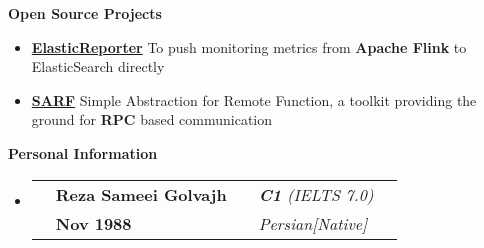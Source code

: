 \documentclass[letterpaper,12pt]{article}[leftmargin=*]
\makeatletter
\def \entryspacing {-0pt}
\renewcommand{\section}[2]{\vspace{5pt}
  \colorbox{secondary}{\color{white}\raggedbottom\normalsize\textbf{{#1}{\hspace{7pt}#2}}}
}
\newcommand{\resumeEntryStart}{\begin{itemize}[leftmargin=2.5mm]}
\newcommand{\resumeEntryEnd}{\end{itemize}\vspace{\entryspacing}}
\newcommand{\aboutMeEntryTSDL}[4]{
  \vspace{-1pt}\item[]
    \begin{tabular*}{0.97\textwidth}{l@{\extracolsep{\fill}}lrlr}
	  \color{primary}{Full name} & \textbf{\color{accent}#1} &
	  \color{primary}{English Fluency} & \textit{\color{accent}#3} \\
	  \color{primary}{Date of Birth} & \textbf{\color{accent}#2} &
	  \color{primary}{Other Languages} & \textit{\color{accent}#4} \\
    \end{tabular*}\vspace{-6pt}
}
\newcommand{\resumeEntryS}[2]{
  \item[]\small{
    \textbf{\color{primary}#1 }{ #2 \vspace{-6pt}}
  }
}
\makeatother
\begin{document}
\section{\faFolderOpen}{Open Source Projects}
	\resumeEntryStart
		\resumeEntryS{\href{https://github.com/sameei/elasticreporter}{ElasticReporter}} {To push monitoring metrics from \textbf{Apache Flink} to ElasticSearch directly}
		\resumeEntryS{\href{https://github.com/sameei/SARF}{SARF}} {Simple Abstraction for Remote Function, a toolkit providing the ground for \textbf{RPC} based communication}
	\resumeEntryEnd
	

\section{\faUser}{Personal Information}
    \resumeEntryStart
      \aboutMeEntryTSDL
	  	{Reza Sameei Golvajh}{Nov 1988}{\textbf{C1} (IELTS 7.0)}{Persian[Native]}
    \resumeEntryEnd
  
\end{document}
